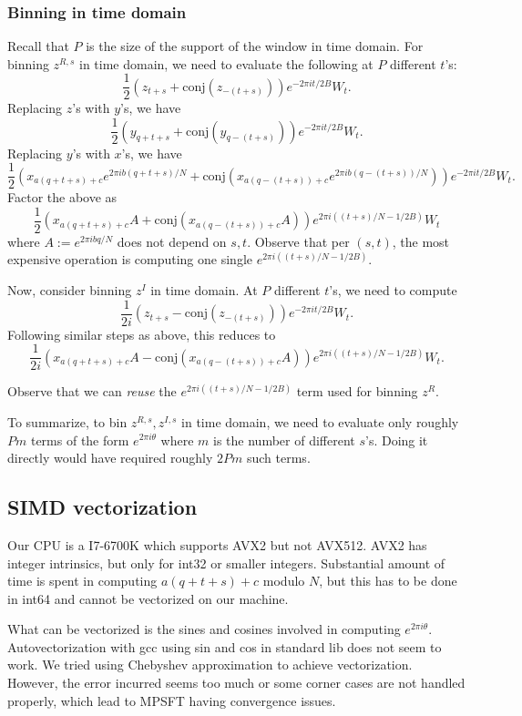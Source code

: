 \documentclass[10pt]{article}
\begin{document}
\subsubsection{Binning in time domain}
Recall that $P$ is the size of the support of the window in time domain. For binning $z^{R,s}$ in time domain, we need to evaluate the following at $P$ different $t$'s:
$$\frac{1}{2} ( z_{t+s} + \text{conj}(z_{-(t+s)})) e^{-2\pi i t/2B} W_t.$$
Replacing $z$'s with $y$'s, we have
$$\frac{1}{2}(y_{q+t+s} + \text{conj}(y_{q-(t+s)})) e^{-2\pi i t/2B}W_t.$$
Replacing $y$'s with $x$'s, we have
$$\frac{1}{2}\left(x_{a(q+t+s)+c}e^{2\pi i b(q+t+s)/N} + \text{conj}(x_{a(q-(t+s))+c} e^{2\pi i b(q-(t+s))/N})\right) e^{-2\pi i t/2B}W_t.$$
Factor the above as
$$\frac{1}{2} \left( x_{a(q+t+s)+c} A + \text{conj}(x_{a(q-(t+s))+c} A)\right)e^{2\pi i ((t+s)/N - 1/2B)} W_t $$
where $A:= e^{2\pi i bq/N}$ does not depend on $s, t$. Observe that per $(s, t)$, the most expensive operation is computing one single $e^{2\pi i ((t+s)/N - 1/2B)}$.

Now, consider binning $z^I$ in time domain. At $P$ different $t$'s, we need to compute
$$\frac{1}{2i} ( z_{t+s} - \text{conj}(z_{-(t+s)})) e^{-2\pi i t/2B} W_t.$$
Following similar steps as above, this reduces to
$$\frac{1}{2i} \left( x_{a(q+t+s)+c} A - \text{conj}(x_{a(q-(t+s))+c} A)\right)e^{2\pi i ((t+s)/N - 1/2B)} W_t.$$

Observe that we can \emph{reuse} the $e^{2\pi i ((t+s)/N - 1/2B)}$ term used for binning $z^R$.

To summarize, to bin $z^{R,s}, z^{I,s}$ in time domain, we need to evaluate only roughly $P m$ terms of the form $e^{2\pi i \theta}$ where $m$ is the number of different $s$'s. Doing it directly would have required roughly $2P m$ such terms.

\subsection{SIMD vectorization}

Our CPU is a I7-6700K which supports AVX2 but not AVX512. AVX2 has integer intrinsics, but only for int32 or smaller integers. Substantial amount of time is spent in computing $a(q+t+s)+c$ modulo $N$, but this has to be done in int64 and cannot be vectorized on our machine.

What can be vectorized is the sines and cosines involved in computing $e^{2\pi i \theta}$. Autovectorization with gcc using sin and cos in standard lib does not seem to work. We tried using Chebyshev approximation to achieve vectorization. However, the error incurred seems too much or some corner cases are not handled properly, which lead to MPSFT having convergence issues.
\end{document}
